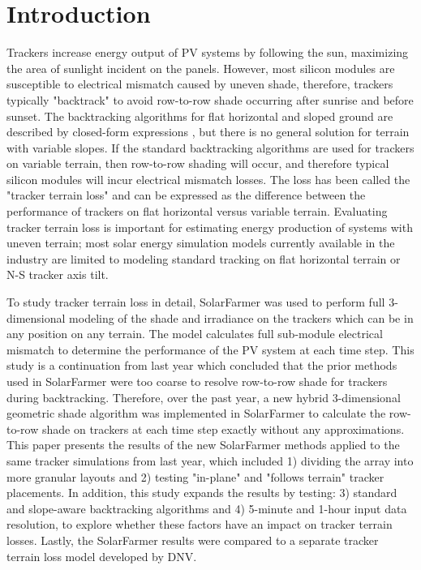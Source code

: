 \documentclass[conference]{IEEEtran}
\begin{document}
\section{Introduction}
Trackers increase energy output of PV systems by following the sun, maximizing the area of sunlight incident on the panels. However, most silicon modules are susceptible to electrical mismatch caused by uneven shade, therefore, trackers typically "backtrack" to avoid  row-to-row shade occurring after sunrise and before sunset. The backtracking algorithms for flat horizontal and sloped ground are described by closed-form expressions \cite{Marion2013,Anderson2020}, but there is no general solution for terrain with variable slopes. If the standard backtracking algorithms are used for trackers on variable terrain, then row-to-row shading will occur, and therefore typical silicon modules will incur electrical mismatch losses. The loss has been called the "tracker terrain loss" and can be expressed as the difference between the performance of trackers on flat horizontal versus variable terrain. Evaluating tracker terrain loss is important for estimating energy production of systems with uneven terrain; most solar energy simulation models currently available in the industry are limited to modeling standard tracking on flat horizontal terrain or N-S tracker axis tilt.

To study tracker terrain loss in detail, SolarFarmer \cite{Mikofski_8547323} was used to perform full 3-dimensional modeling of the shade and irradiance on the trackers which can be in any position on any terrain. The model calculates full sub-module electrical mismatch to determine the performance of the PV system at each time step. This study is a continuation from last year \cite{Mikofski_9300381} which concluded that the prior methods used in SolarFarmer were too coarse to resolve row-to-row shade for trackers during backtracking. Therefore, over the past year, a new hybrid 3-dimensional geometric shade algorithm was implemented in SolarFarmer to calculate the row-to-row shade on trackers at each time step exactly without any approximations. This paper presents the results of the new SolarFarmer methods applied to the same tracker simulations from last year, which included 1) dividing the array into more granular layouts and 2) testing "in-plane" and "follows terrain" tracker placements. In addition, this study expands the results by testing: 3) standard and slope-aware backtracking algorithms and 4) 5-minute and 1-hour input data resolution, to explore whether these factors have an impact on tracker terrain losses. Lastly, the SolarFarmer results were compared to a separate tracker terrain loss model developed by DNV. 
\end{document}
